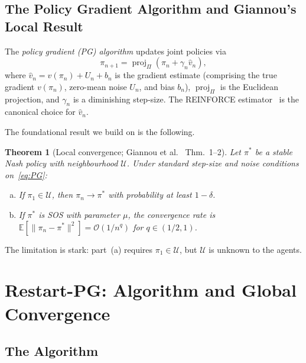 \documentclass{article}
\newtheorem{theorem}{Theorem}
\newcommand{\E}{\mathbb{E}}
\newcommand{\calU}{\mathcal{U}}
\newcommand{\norm}[1]{\| #1 \|}
\begin{document}
\subsection{The Policy Gradient Algorithm and Giannou's Local Result}
\label{sec:local}

The \emph{policy gradient (PG) algorithm} updates joint policies via
\begin{equation}
  \label{eq:PG}
  \pi_{n+1} = \operatorname{proj}_\Pi\!\left(
    \pi_n + \gamma_n \hat{v}_n
  \right),
\end{equation}
where $\hat{v}_n = v(\pi_n) + U_n + b_n$ is the gradient estimate
(comprising the true gradient $v(\pi_n)$, zero-mean noise $U_n$,
and bias $b_n$), $\operatorname{proj}_\Pi$ is the Euclidean projection,
and $\gamma_n$ is a diminishing step-size. The REINFORCE
estimator~\cite{williams1992} is the canonical choice for $\hat{v}_n$.

The foundational result we build on is the following.

\begin{theorem}[Local convergence; Giannou et al.~\cite{giannou2022} Thm.~1--2]
\label{thm:local}
Let $\pi^*$ be a stable Nash policy with neighbourhood $\calU$.
Under standard step-size and noise conditions on~\eqref{eq:PG}:
\begin{enumerate}[(a)]
\item If $\pi_1 \in \calU$, then $\pi_n \to \pi^*$ with probability
  at least $1 - \delta$.
\item If $\pi^*$ is SOS with parameter $\mu$, the convergence rate is
  $\E[\norm{\pi_n - \pi^*}^2] = \mathcal{O}(1/n^q)$ for
  $q \in (1/2, 1)$.
\end{enumerate}
\end{theorem}

The limitation is stark: part~(a) requires $\pi_1 \in \calU$, but
$\calU$ is unknown to the agents.

\section{Restart-PG: Algorithm and Global Convergence}
\label{sec:restart}

\subsection{The Algorithm}
\label{sec:alg}
\end{document}
